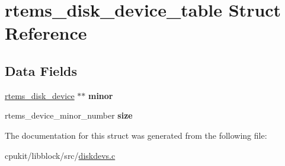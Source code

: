 \hypertarget{structrtems__disk__device__table}{}\section{rtems\+\_\+disk\+\_\+device\+\_\+table Struct Reference}
\label{structrtems__disk__device__table}
\subsection*{Data Fields}
\begin{DoxyCompactItemize}
\item 
\mbox{\label{structrtems__disk__device__table_a311c6c01eaffbc35cf08e4213ed8b285}} 
\mbox{\hyperlink{structrtems__disk__device}{rtems\+\_\+disk\+\_\+device}} $\ast$$\ast$ {\bfseries minor}
\item 
\mbox{\label{structrtems__disk__device__table_ab52aab2f4daf08b937f4efa1071c9b29}} 
rtems\+\_\+device\+\_\+minor\+\_\+number {\bfseries size}
\end{DoxyCompactItemize}


The documentation for this struct was generated from the following file\+:\begin{DoxyCompactItemize}
\item 
cpukit/libblock/src/\mbox{\hyperlink{diskdevs_8c}{diskdevs.\+c}}\end{DoxyCompactItemize}

